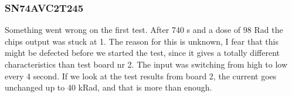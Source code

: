 \documentclass[12pt]{article}
\numberwithin{figure}{section}
\begin{document}
\FloatBarrier

\subsubsection{SN74AVC2T245}

Something went wrong on the first test. After 740 s and a dose of 98 Rad the chips output was stuck at 1. The reason for this is unknown, I fear that this might be defected before we started the test, since it gives a totally different characteristics than test board nr 2.
The input was switching from high to low every 4 second. If we look at the test results from board 2, the current goes unchanged up to 40 kRad, and that is more than enough.
\end{document}
